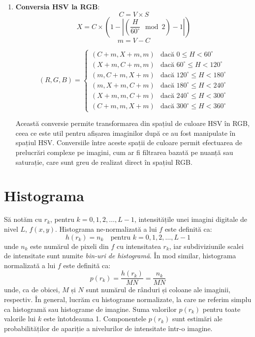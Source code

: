 \documentclass[a4paper,12pt]{report}
\begin{document}
\begin{enumerate}
    \item \textbf{Conversia HSV la RGB}:
          \[
              C = V \times S
          \]
          \[
              X = C \times (1 - \left| \left(\frac{H}{60^\circ} \mod 2 \right) - 1 \right|)
          \]
          \[
              m = V - C
          \]

          \[
              (R, G, B) = \begin{cases}
                  (C+m, X+m, m) & \text{dacă } 0 \leq H < 60^\circ          \\
                  (X+m, C+m, m) & \text{dacă } 60^\circ \leq H < 120^\circ  \\
                  (m, C+m, X+m) & \text{dacă } 120^\circ \leq H < 180^\circ \\
                  (m, X+m, C+m) & \text{dacă } 180^\circ \leq H < 240^\circ \\
                  (X+m, m, C+m) & \text{dacă } 240^\circ \leq H < 300^\circ \\
                  (C+m, m, X+m) & \text{dacă } 300^\circ \leq H < 360^\circ
              \end{cases}
          \]

          Această conversie permite transformarea din spațiul de culoare HSV în RGB, ceea ce este util pentru afișarea imaginilor după ce au fost manipulate în spațiul HSV. Conversiile între aceste spații de culoare permit efectuarea de prelucrări complexe pe imagini, cum ar fi filtrarea bazată pe nuanță sau saturație, care sunt greu de realizat direct în spațiul RGB.
\end{enumerate}

\section{Histograma}
Să notăm cu $r_k$, pentru $k = 0, 1, 2, \ldots, L-1$, intensitățile unei imagini digitale de nivel $L$, $f(x, y)$. Histograma ne-normalizată a lui $f$ este definită ca:
\[
    h(r_k) = n_k \quad \text{pentru } k = 0, 1, 2, \ldots, L-1
\]
unde $n_k$ este numărul de pixeli din $f$ cu intensitatea $r_k$, iar subdiviziunile scalei de intensitate sunt numite \textit{bin-uri de histogramă}. În mod similar, histograma normalizată a lui $f$ este definită ca:
\[
    p(r_k) = \frac{h(r_k)}{MN} = \frac{n_k}{MN}
\]
unde, ca de obicei, $M$ și $N$ sunt numărul de rânduri și coloane ale imaginii, respectiv. În general, lucrăm cu histograme normalizate, la care ne referim simplu ca histogramă sau histograme de imagine. Suma valorilor $p(r_k)$ pentru toate valorile lui $k$ este întotdeauna 1. Componentele $p(r_k)$ sunt estimări ale probabilităților de apariție a nivelurilor de intensitate într-o imagine.
\end{document}
